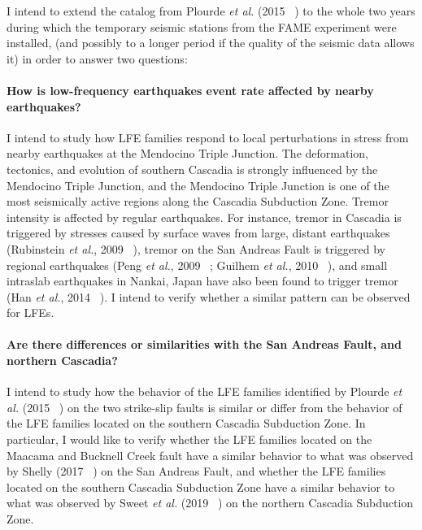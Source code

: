 \documentclass[letterpaper, 12pt]{article}
\begin{document}
I intend to extend the catalog from Plourde \textit{et al.} (2015 ~\cite{PLO_2015}) to the whole two years during which the temporary seismic stations from the FAME experiment were installed, (and possibly to a longer period if the quality of the seismic data allows it) in order to answer two questions:

\paragraph{How is low-frequency earthquakes event rate affected by nearby earthquakes?} I intend to study how LFE families respond to local perturbations in stress from nearby earthquakes at the Mendocino Triple Junction. The deformation, tectonics, and evolution of southern Cascadia is strongly influenced by the Mendocino Triple Junction, and the Mendocino Triple Junction is one of the most seismically active regions along the Cascadia Subduction Zone. Tremor intensity is affected by regular earthquakes. For instance, tremor in Cascadia is triggered by stresses caused by surface waves from large, distant earthquakes (Rubinstein \textit{et al.}, 2009 ~\cite{RUB_2009}), tremor on the San Andreas Fault is triggered by regional earthquakes (Peng \textit{et al.}, 2009 ~\cite{PEN_2009}; Guilhem \textit{et al.}, 2010 ~\cite{GUI_2010}), and small intraslab earthquakes in Nankai, Japan have also been found to trigger tremor (Han \textit{et al.}, 2014 ~\cite{HAN_2014}). I intend to verify whether a similar pattern can be observed for LFEs. 

\paragraph{Are there differences or similarities with the San Andreas Fault, and northern Cascadia?} I intend to study how the behavior of the LFE families identified by Plourde \textit{et al.} (2015  ~\cite{PLO_2015}) on the two strike-slip faults is similar or differ from the behavior of the LFE families located on the southern Cascadia Subduction Zone. In particular, I would like to verify whether the LFE families located on the Maacama and Bucknell Creek fault have a similar behavior to what was observed by Shelly (2017 ~\cite{SHE_2017}) on the San Andreas Fault, and whether the LFE families located on the southern Cascadia Subduction Zone have a similar behavior to what was observed by Sweet \textit{et al.} (2019 ~\cite{SWE_2019}) on the northern Cascadia Subduction Zone. \\
\end{document}
